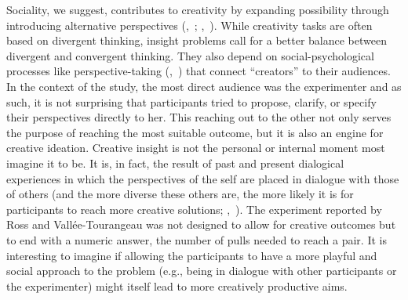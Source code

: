 \documentclass[twocolumn, serif, reflection, authordate]{jote-article}
\begin{document}
Sociality, we suggest, contributes to creativity by expanding
possibility through introducing alternative perspectives (,~\citeyear{Glaveanu2020}; ,~\citeyear{Zittoun2015}). While creativity tasks are often based on
divergent thinking, insight problems call for a better balance between
divergent and convergent thinking. They also depend on
social-psychological processes like perspective-taking (,~\citeyear{Glaveanu2015})
that connect ``creators'' to their audiences. In the context of the
study, the most direct audience was the experimenter and as such, it is
not surprising that participants tried to propose, clarify, or specify
their perspectives directly to her. This reaching out to the other not
only serves the purpose of reaching the most suitable outcome, but it is
also an engine for creative ideation. Creative insight is not the
personal or internal moment most imagine it to be. It is, in fact, the
result of past and present dialogical experiences in which the
perspectives of the self are placed in dialogue with those of others
(and the more diverse these others are, the more likely it is for
participants to reach more creative solutions; ,~\citeyear{Gassmann2001}). The
experiment reported by Ross and Vallée-Tourangeau was not designed to
allow for creative outcomes but to end with a numeric answer, the number
of pulls needed to reach a pair. It is interesting to imagine if allowing the participants to have a more playful and social approach to the problem (e.g., being in dialogue with other participants or the experimenter) might itself lead to more creatively productive aims.
\end{document}
